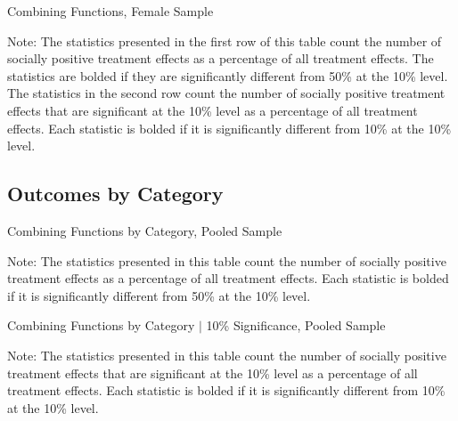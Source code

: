 	\begin{table}[H]
	\begin{threeparttable}
     \caption{Combining Functions, Female Sample} 
     \label{table:abccare_rslt_female_counts_all}
	
	\begin{tablenotes}
	\footnotesize
	 Note: The statistics presented in the first row of this table count the number of socially positive 
	treatment effects as a percentage of all treatment effects. The statistics are bolded if they are 
	significantly different from 50\% at the 10\% level. The statistics in the second row count the
	number of socially positive treatment effects that are significant at the 10\% level as a percentage
	of all treatment effects. Each statistic is bolded if it is significantly different from 10\% at the 10\% 
	level.
	\end{tablenotes}
	\end{threeparttable}
	\end{table}  

\subsection{{Outcomes by Category}} \label{appendix:morebycat}


	\begin{sidewaystable}[H]
	\begin{threeparttable}
     \caption{Combining Functions by Category, Pooled Sample} 
     \label{table:abccare_rslt_pooled_counts_n50a100_all}
	
		\begin{tablenotes}
	\footnotesize
	\item Note: The statistics presented in this table count the number of socially positive treatment 
	 effects as a percentage of all treatment effects. Each statistic is bolded if it is significantly
	 different from 50\% at the 10\% level.
	\end{tablenotes}
	\end{threeparttable}
	\end{sidewaystable}   

	\begin{sidewaystable}[H]
	\begin{threeparttable}
     \caption{Combining Functions by Category $|$ 10\% Significance, Pooled Sample} 
     \label{table:abccare_rslt_pooled_counts_n10a10_all}
	
	\begin{tablenotes}
	\footnotesize
	\item Note: The statistics presented in this table count the number of socially positive treatment 
	effects that are significant at the 10\% level as a percentage of all treatment effects. Each statistic
	is bolded if it is significantly different from 10\% at the 10\% level.
	\end{tablenotes}
	\end{threeparttable}
	\end{sidewaystable}   

